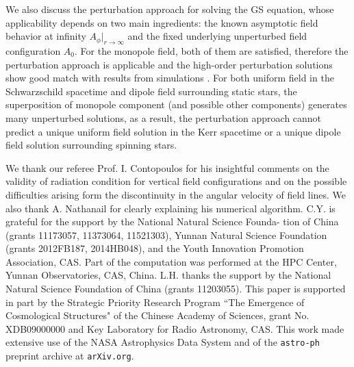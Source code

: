 \documentclass[iop,apj]{emulateapj}
\begin{document}
We also discuss the perturbation approach for solving the GS equation, whose
applicability depends on two main ingredients:
the known asymptotic field behavior at infinity $A_\phi|_{r\rightarrow\infty}$
and the fixed underlying unperturbed field configuration $A_0$.
For the monopole field, both of them are satisfied, therefore the perturbation approach
is applicable and the high-order perturbation solutions
show good match with results from simulations \citep{Pan2015b}.
For both uniform field in the Schwarzschild spacetime and dipole field surrounding static stars,
the superposition of monopole component (and possible other components) generates many unperturbed solutions,
as a result, the perturbation approach cannot predict
a unique uniform field solution in the Kerr spacetime or
a unique dipole field solution surrounding spinning stars.


\acknowledgements
We thank our referee Prof. I. Contopoulos for his insightful comments
on the validity of radiation condition for vertical field configurations and
on the possible difficulties arising form the discontinuity in the angular velocity of field lines.
We also thank A. Nathanail for clearly explaining his numerical algorithm.
C.Y. is grateful for the support by the National Natural Science Founda-
tion of China (grants 11173057, 11373064, 11521303),
Yunnan Natural Science Foundation (grants 2012FB187,
2014HB048), and the Youth Innovation Promotion Association, CAS.
Part of the computation was performed
at the HPC Center, Yunnan Observatories, CAS, China.
L.H. thanks the support by the National
Natural Science Foundation of China (grants 11203055).
This paper is supported in part by the Strategic Priority Research Program
``The Emergence of Cosmological Structures" of the Chinese Academy of Sciences,
grant No. XDB09000000 and Key Laboratory for Radio Astronomy, CAS.
This work made extensive use of the NASA Astrophysics Data System and
of the {\tt astro-ph} preprint archive at {\tt arXiv.org}.
\end{document}
